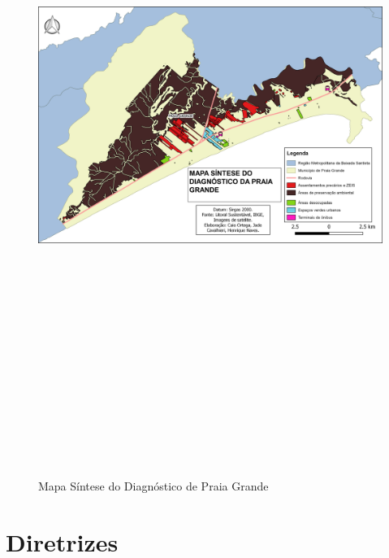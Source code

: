 	\begin{landscape}
		\begin{figure}[h]
			\centering
			\caption{Mapa Síntese do Diagnóstico de Praia Grande}
			\includegraphics[width=22cm,height=22cm,keepaspectratio]{img/mapa_sintese_praia_grande_final.png}
			\label{mapa_sintese_pg}
		\end{figure}
	\end{landscape}

%
%

	\chapter{Diretrizes}
		
